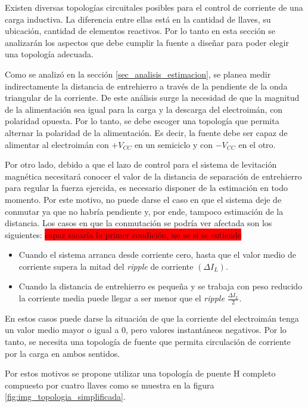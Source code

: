 Existen diversas topologías circuitales posibles para el control de corriente de una carga inductiva. La diferencia entre ellas está en la cantidad de llaves, su ubicación, cantidad de elementos reactivos. Por lo tanto en esta sección se analizarán los aspectos que debe cumplir la fuente a diseñar para poder elegir una topología adecuada.

Como se analizó en la sección \ref{sec_analisis_estimacion}, se planea medir indirectamente la distancia de entrehierro a través de la pendiente de la onda triangular de la corriente. De este análisis surge la necesidad de que la magnitud de la alimentación sea igual para la carga y la descarga del electroimán, con polaridad opuesta. Por lo tanto, se debe escoger una topología que permita alternar la polaridad de la alimentación. Es decir, la fuente debe ser capaz de alimentar al electroimán con $+V_{CC}$  en un semiciclo y con $-V_{CC}$ en el otro.

Por otro lado, debido a que el lazo de control para el sistema de levitación magnética necesitará conocer el valor de la distancia de separación de entrehierro para regular la fuerza ejercida, es necesario disponer de la estimación en todo momento. Por este motivo, no puede darse el caso en que el sistema deje de conmutar ya que no habría pendiente y, por ende, tampoco estimación de la distancia. Los casos en que la conmutación se podría ver afectada son los siguientes: 
\colorbox{red}{capaz sacaría la primer condición, no se si se entiende}
\begin{itemize} 
	\item Cuando el sistema arranca desde corriente cero, hasta que el valor medio de corriente supera la mitad del \textsl{ripple} de corriente $(\Delta I_{L})$.
	
	\item Cuando la distancia de entrehierro es pequeña y se trabaja con peso reducido la corriente media puede llegar a ser menor que el \textsl{ripple} $\frac{\Delta I_{L}}{2}$.
\end{itemize}

En estos casos puede darse la situación de que la corriente del electroimán tenga un valor medio mayor o igual a 0, pero valores instantáneos negativos. Por lo tanto, se necesita una topología de fuente que permita circulación de corriente por la carga en ambos sentidos.

Por estos motivos se propone utilizar una topología de puente H completo compuesto por cuatro llaves como se muestra en la figura \ref{fig:img_topologia_simplificada}.

